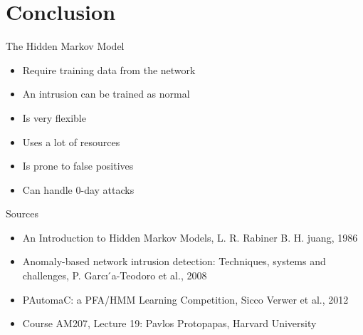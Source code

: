 \section{Conclusion}
\begin{frame}
The Hidden Markov Model
	\begin{itemize}
		\item Require training data from the network
		\item An intrusion can be trained as normal 		
		\item Is very flexible
		\item Uses a lot of resources
		\item Is prone to false positives
		\item Can handle 0-day attacks
	\end{itemize}
\end{frame}

\begin{frame}
Sources
\begin{itemize}
	\item An Introduction to Hidden Markov Models, L. R. Rabiner B. H. juang, 1986
	\item Anomaly-based network intrusion detection: Techniques, systems and challenges, P. Garcı ́a-Teodoro et al., 2008 
	\item PAutomaC: a PFA/HMM Learning Competition, Sicco Verwer et al., 2012
	\item Course AM207, Lecture 19: Pavlos Protopapas, Harvard University
\end{itemize}
\end{frame}

